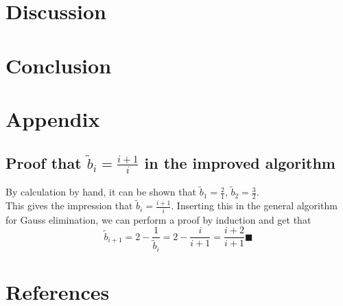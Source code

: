 \documentclass[10pt,a4paper]{article}
\begin{document}
\section{Discussion}

\section{Conclusion}
\section{Appendix}
\subsection{Proof that $\tilde{b}_i=\frac{i+1}{i}$ in the improved algorithm}
By calculation by hand, it can be shown that  $\tilde{b}_1=\frac{2}{1}$,  $\tilde{b}_2=\frac{3}{2}$.\\
This gives the impression that  $\tilde{b}_i=\frac{i+1}{i}$.
Inserting this in the general algorithm for Gauss elimination, we can perform a proof by induction and get that
  $$\tilde{b}_{i+1}=2-\frac{1}{\tilde{b}_{i}}=2-\frac{i}{i+1}=\frac{i+2}{i+1} \blacksquare
$$
\section{References}
 
\begin{thebibliography}{9}

\end{thebibliography}













\begin{comment}

$$
\begin{bmatrix}
0 & 0 & 0 & 0 \\
0 & 0 & 0 & 0 \\
0 & 0 & 0 & 0 \\
0 & 0 & 0 & 0 \\
\end{bmatrix}
$$

\begin{lstlisting}[caption=insert caption]
for (unsigned int i = 0; i<100;i++{
}
\end{lstlisting}

\begin{figure}[h]
\texttt{[image: ]}
\caption{include caption}
\end{figure}


HOW TO CITE SOURCES:
use
\cite{reference name}
in the text, and
\bibitem{reference name} 



\end{comment}
\end{document}

